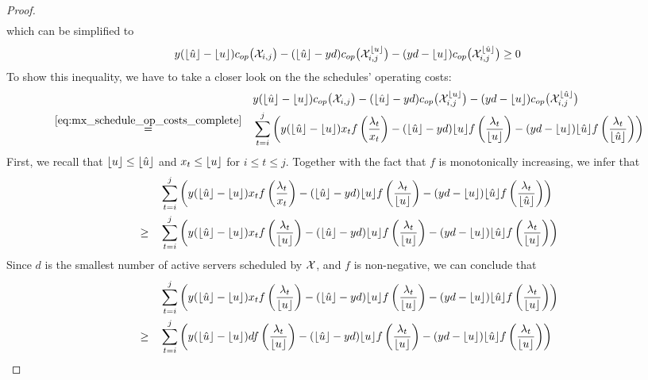 \begin{proof}
\begin{align*}
\end{align*}
which can be simplified to
\begin{equation*}
	y(\lfloor\hat{u}\rfloor-\lfloor u\rfloor)c_{op}\bigl(\mathcal{X}_{i,j}\bigr)-(\lfloor\hat{u}\rfloor-yd)c_{op}\bigl(\mathcal{X}_{i,j}^{\lfloor u\rfloor}\bigr)-(yd-\lfloor u\rfloor)c_{op}\bigl(\mathcal{X}_{i,j}^{\lfloor\hat{u}\rfloor}\bigr)\ge 0
\end{equation*}
To show this inequality, we have to take a closer look on the the schedules' operating costs:
\begin{align*}
	&&&y(\lfloor\hat{u}\rfloor-\lfloor u\rfloor)c_{op}\bigl(\mathcal{X}_{i,j}\bigr)-(\lfloor\hat{u}\rfloor-yd)c_{op}\bigl(\mathcal{X}_{i,j}^{\lfloor u\rfloor}\bigr)-(yd-\lfloor u\rfloor)c_{op}\bigl(\mathcal{X}_{i,j}^{\lfloor\hat{u}\rfloor}\bigr)\\
	&\stackrel{\eqref{eq:mx_schedule_op_costs_complete}}{=}&&\sum\limits_{t=i}^j\left(y(\lfloor\hat{u}\rfloor-\lfloor u\rfloor)x_tf\left(\frac{\lambda_t}{x_t}\right)-(\lfloor\hat{u}\rfloor-yd)\lfloor u\rfloor f\left(\frac{\lambda_t}{\lfloor u\rfloor}\right)-(yd-\lfloor u\rfloor)\lfloor\hat{u}\rfloor f\left(\frac{\lambda_t}{\lfloor\hat{u}\rfloor}\right)\right)
\end{align*}
First, we recall that $\lfloor u\rfloor\le\lfloor\hat{u}\rfloor$ and $x_t\le\lfloor u\rfloor$ for $i\le t\le j$. Together with the fact that $f$ is monotonically increasing, we infer that
\begin{align*}
	&&&\sum\limits_{t=i}^j\left(y(\lfloor\hat{u}\rfloor-\lfloor u\rfloor)x_tf\left(\frac{\lambda_t}{x_t}\right)-(\lfloor\hat{u}\rfloor-yd)\lfloor u\rfloor f\left(\frac{\lambda_t}{\lfloor u\rfloor}\right)-(yd-\lfloor u\rfloor)\lfloor\hat{u}\rfloor f\left(\frac{\lambda_t}{\lfloor\hat{u}\rfloor}\right)\right)\\
	&\ge&&\sum\limits_{t=i}^j\left(y(\lfloor\hat{u}\rfloor-\lfloor u\rfloor)x_tf\left(\frac{\lambda_t}{\lfloor u\rfloor}\right)-(\lfloor\hat{u}\rfloor-yd)\lfloor u\rfloor f\left(\frac{\lambda_t}{\lfloor u\rfloor}\right)-(yd-\lfloor u\rfloor)\lfloor\hat{u}\rfloor f\left(\frac{\lambda_t}{\lfloor u\rfloor}\right)\right)
\end{align*}
Since $d$ is the smallest number of active servers scheduled by $\mathcal{X}$, and $f$ is non-negative, we can conclude that
\begin{align*}
	&&&\sum\limits_{t=i}^j\left(y(\floor{\hat{u}}-\floor{u})x_tf\left(\frac{\lambda_t}{\floor{u}}\right)-(\floor{\hat{u}}-yd)\floor{u}f\left(\frac{\lambda_t}{\floor{u}}\right)-(yd-\floor{u})\floor{\hat{u}}f\left(\frac{\lambda_t}{\floor{u}}\right)\right)\\
	&\ge&&\sum\limits_{t=i}^j\left(y(\floor{\hat{u}}-\floor{u})df\left(\frac{\lambda_t}{\floor{u}}\right)-(\floor{\hat{u}}-yd)\floor{u}f\left(\frac{\lambda_t}{\floor{u}}\right)-(yd-\floor{u})\floor{\hat{u}}f\left(\frac{\lambda_t}{\floor{u}}\right)\right)

\end{align*}
\end{proof}
